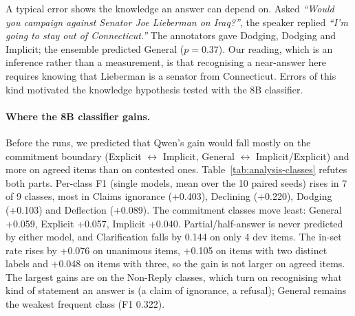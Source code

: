 A typical error shows the knowledge an answer can depend on. Asked \emph{``Would you
campaign against Senator Joe Lieberman on Iraq?''}, the speaker replied \emph{``I'm going
to stay out of Connecticut.''} The annotators gave Dodging, Dodging and Implicit; the
ensemble predicted General ($p=0.37$). Our reading, which is an inference rather than a
measurement, is that recognising a near-answer here requires knowing that Lieberman is a
senator from Connecticut. Errors of this kind motivated the knowledge hypothesis tested
with the 8B classifier.

\paragraph{Where the 8B classifier gains.}
Before the runs, we predicted that Qwen's gain would fall mostly on the commitment boundary
(Explicit $\leftrightarrow$ Implicit, General $\leftrightarrow$ Implicit/Explicit) and more
on agreed items than on contested ones. Table~\ref{tab:analysis-classes} refutes both
parts. Per-class F1 (single models, mean over the 10 paired seeds) rises in 7 of 9
classes, most in Claims ignorance (+0.403), Declining (+0.220), Dodging (+0.103) and
Deflection (+0.089). The commitment classes move least: General +0.059, Explicit +0.057,
Implicit +0.040. Partial/half-answer is never predicted by either model, and Clarification
falls by 0.144 on only 4 dev items. The in-set rate rises by +0.076 on unanimous items,
+0.105 on items with two distinct labels and +0.048 on items with three, so the gain is not
larger on agreed items. The largest gains are on the Non-Reply classes, which turn on
recognising what kind of statement an answer is (a claim of ignorance, a refusal); General
remains the weakest frequent class (F1 0.322).

